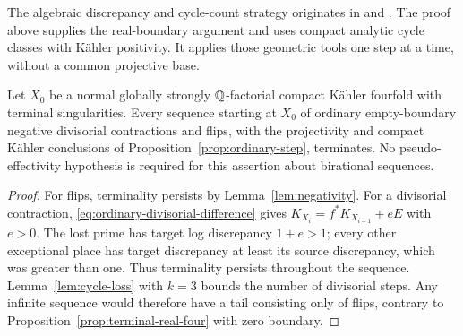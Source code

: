 The algebraic discrepancy and cycle-count strategy originates in
\cite[Theorem~5-1-15 and Lemmas~5-1-16--5-1-17]{KMM1987}
and \cite{Fujino2004,Fujino2005Addendum}.
The proof above supplies the real-boundary argument and uses compact
analytic cycle classes with K\"ahler positivity.  It applies those
geometric tools one step at a time, without a common projective base.

\begin{corollary}\label{prop:terminal-four}
Let $X_0$ be a normal globally strongly $\mathbb Q$-factorial compact
K\"ahler fourfold with terminal singularities.
Every sequence starting at $X_0$ of ordinary empty-boundary negative
divisorial contractions and flips, with the projectivity and compact
K\"ahler conclusions of Proposition~\ref{prop:ordinary-step}, terminates.
No pseudo-effectivity hypothesis is required for this assertion about
birational sequences.
\end{corollary}

\begin{proof}
For flips, terminality persists by Lemma~\ref{lem:negativity}.
For a divisorial contraction, \eqref{eq:ordinary-divisorial-difference}
gives $K_{X_i}=f^*K_{X_{i+1}}+eE$ with $e>0$.
The lost prime has target log discrepancy $1+e>1$; every other
exceptional place has target discrepancy at least its source
discrepancy, which was greater than one.  Thus terminality persists
throughout the sequence.
Lemma~\ref{lem:cycle-loss} with $k=3$ bounds the number of divisorial
steps.  Any infinite sequence would therefore have a tail consisting
only of flips, contrary to Proposition~\ref{prop:terminal-real-four}
with zero boundary.
\end{proof}
